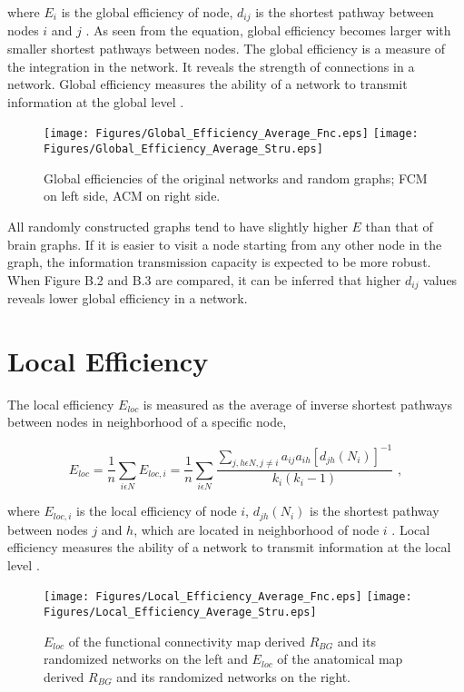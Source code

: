 where $E_i$ is the global efficiency of node, $d_{ij}$ is the shortest pathway between nodes $i$ and $j$ \citep{LAT01}. As seen from the equation, global efficiency becomes larger with smaller shortest pathways between nodes. The global efficiency is a measure of the integration in the network. It reveals the strength of connections in a network. Global efficiency measures the ability of a network to transmit information at the global level \citep{XYZDA}.


\begin{figure}[htbp]
 
  \centering
	 \texttt{[image: Figures/Global\_Efficiency\_Average\_Fnc.eps]}
	 \texttt{[image: Figures/Global\_Efficiency\_Average\_Stru.eps]}
  \caption[Global Efficiency]{Global efficiencies of the original networks and random graphs; FCM on left side, ACM on right side.} 
    \label{fig:Global Efficiency}
 	
\end{figure}

All randomly constructed graphs tend to have slightly higher $E$ than that of brain graphs. If it is easier to visit a node starting from any other node in the graph, the information transmission capacity is expected to be more robust. When Figure B.2 and B.3 are compared, it can be inferred that higher $d_{ij}$ values reveals lower global efficiency in a network. 



\section{Local Efficiency}
The local efficiency $E_{loc}$ is measured as the average of inverse shortest pathways between nodes in neighborhood of a specific node, 

\begin{equation}
E_{loc} = \frac{1}{n}\sum\limits_{i \epsilon N} E_{loc,i} = \frac{1}{n}\sum\limits_{i \epsilon N} \frac{\sum\limits_{j,h \epsilon N, j\neq i} a_{ij} a_{ih}[d_{jh}(N_i)]^{-1}}{k_i(k_i - 1) } \,\, ,
\end{equation}

where $E_{loc,i}$ is the local efficiency of node $i$, $d_{jh}(N_i)$ is the shortest pathway between nodes $j$ and $h$, which are located in neighborhood of node $i$ \citep{LAT01}. Local efficiency measures the ability of a network to transmit information at the local level \citep{XYZDA}.


\begin{figure}[htbp]
 
  \centering
	 \texttt{[image: Figures/Local\_Efficiency\_Average\_Fnc.eps]}
	 \texttt{[image: Figures/Local\_Efficiency\_Average\_Stru.eps]}
  \caption[Local Efficiency]{$E_{loc}$ of the functional connectivity map derived $R_{BG}$ and its randomized networks on the left and $E_{loc}$ of the anatomical map derived $R_{BG}$ and its randomized networks on the right. } 
    \label{fig:Local Efficiency}
 	
\end{figure}

